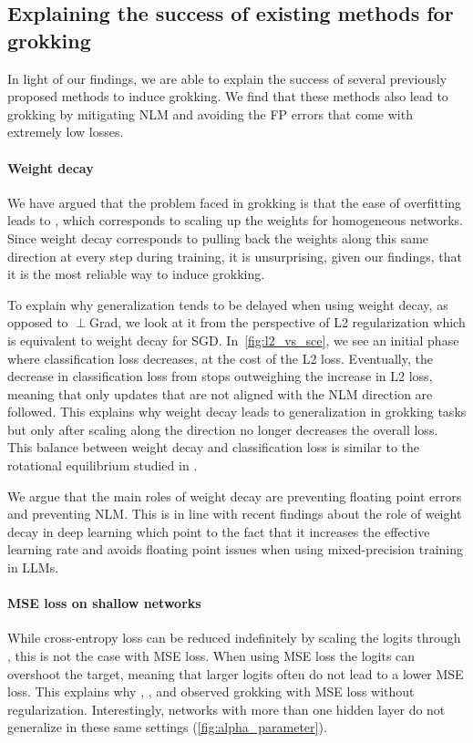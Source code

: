 \subsection{Explaining the success of existing methods for grokking}\label{sec:explain_existing_methods}

In light of our findings, we are able to explain the success of several previously proposed methods to induce grokking. We find that these methods also lead to grokking by mitigating NLM and avoiding the FP errors that come with extremely low losses.

\paragraph{Weight decay} We have argued that the problem faced in grokking is that the ease of overfitting leads to \nlm, which corresponds to scaling up the weights for homogeneous networks. Since weight decay corresponds to pulling back the weights along this same direction at every step during training, it is unsurprising, given our findings, that it is the most reliable way to induce grokking. 

To explain why generalization tends to be delayed when using weight decay, as opposed to $\perp$Grad, we look at it from the perspective of L2 regularization which is equivalent to weight decay for SGD. In~\cref{fig:l2_vs_sce}, we see an initial phase where classification loss decreases, at the cost of the L2 loss.  Eventually, the decrease in classification loss from \nlm stops outweighing the increase in L2 loss, meaning that only updates that are not aligned with the NLM direction are followed. This explains why weight decay leads to generalization in grokking tasks but only after scaling along the \nlm direction no longer decreases the overall loss. This balance between weight decay and classification loss is similar to the rotational equilibrium studied in \cite{kosson2024rotational}.

We argue that the main roles of weight decay are preventing floating point errors and preventing NLM. This is in line with recent findings about the role of weight decay in deep learning \citep{andriushchenko2023needweightdecaymodern} which point to the fact that it increases the effective learning rate and avoids floating point issues when using mixed-precision training in LLMs.

\paragraph{MSE loss on shallow networks}
While cross-entropy loss can be reduced indefinitely by scaling the logits through \nlm, this is not the case with MSE loss. When using MSE loss the logits can overshoot the target, meaning that larger logits often do not lead to a lower MSE loss. This explains why \cite{Barak2022-el}, \cite{Kumar2023-hz}, and \cite{Lyu2023-ga} observed grokking with MSE loss without regularization. Interestingly, networks with more than one hidden layer do not generalize in these same settings (\cref{fig:alpha_parameter}).

